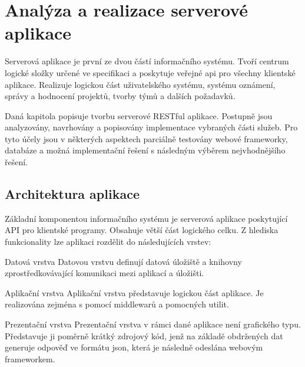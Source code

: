 \chapter{Analýza a realizace serverové aplikace}

Serverová aplikace je první ze dvou částí informačního systému. Tvoří centrum logické složky určené ve specifikaci a poskytuje veřejné \gls{api} pro všechny klientské aplikace. Realizuje logickou část uživatelského systému, systému oznámení, správy a hodnocení projektů, tvorby týmů a dalších požadavků. 

Daná kapitola popisuje tvorbu serverové RESTful aplikace. Postupně jsou analyzovány, navrhovány a popisovány implementace vybraných části služeb. Pro tyto účely jsou v některých aspektech parciálně testovány webové frameworky, databáze a možná implementační řešení s následným výběrem nejvhodnějšího řešení.



\section{Architektura aplikace}

Základní komponentou informačního systému je serverová aplikace poskytující API pro klientské programy. Obsahuje větší část logického celku. Z hlediska funkcionality lze aplikaci rozdělit do následujících vrstev:

\begin{dl}
   \item [Datová vrstva] Datovou vrstvu definují datová úložiště a knihovny zprostředkovávající komunikaci mezi aplikací a úložišti.
   
   \item [Aplikační vrstva] Aplikační vrstva představuje logickou část aplikace. Je realizována zejména s pomocí middlewarů a pomocných utilit.
   
   \item [Prezentační vrstva] Prezentační vrstva v rámci dané aplikace není grafického typu. Představuje ji poměrně krátký zdrojový kód, jenž na základě obdržených dat generuje odpověď ve formátu \gls{json}, která je následně odeslána webovým frameworkem.
   
\end{dl}


